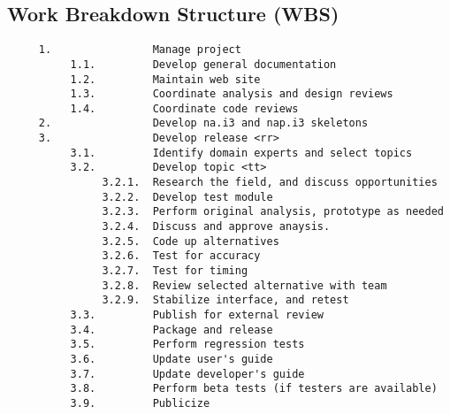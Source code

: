 \subsection{Work Breakdown Structure (WBS)}
\begin{verbatim}
     1.                Manage project
          1.1.         Develop general documentation
          1.2.         Maintain web site
          1.3.         Coordinate analysis and design reviews
          1.4.         Coordinate code reviews
     2.                Develop na.i3 and nap.i3 skeletons
     3.                Develop release <rr>
          3.1.         Identify domain experts and select topics
          3.2.         Develop topic <tt>
               3.2.1.  Research the field, and discuss opportunities
               3.2.2.  Develop test module
               3.2.3.  Perform original analysis, prototype as needed
               3.2.4.  Discuss and approve anaysis.
               3.2.5.  Code up alternatives
               3.2.6.  Test for accuracy
               3.2.7.  Test for timing
               3.2.8.  Review selected alternative with team
               3.2.9.  Stabilize interface, and retest
          3.3.         Publish for external review
          3.4.         Package and release
          3.5.         Perform regression tests
          3.6.         Update user's guide
          3.7.         Update developer's guide
          3.8.         Perform beta tests (if testers are available)
          3.9.         Publicize
\end{verbatim}

